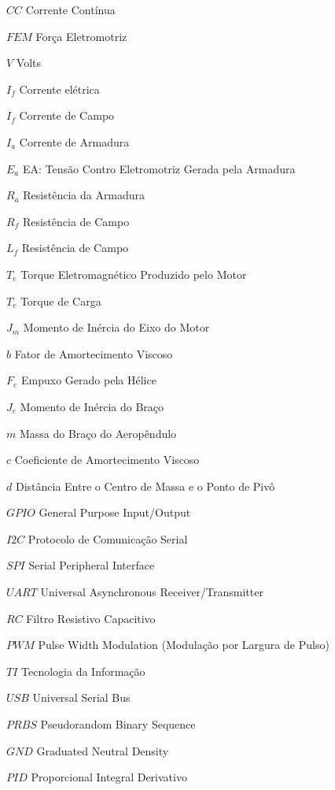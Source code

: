 \begin{siglas}
    \item[$CC$] Corrente Contínua
    \item[$FEM$] Força Eletromotriz
    \item[$V$] Volts
    \item[$I_f$] Corrente elétrica
   \item[$I_f$] Corrente de Campo
   \item[$I_a$] Corrente de Armadura
   \item[$E_a$] EA: Tensão Contro Eletromotriz Gerada pela Armadura
   \item[$R_a$] Resistência da Armadura
   \item[$R_f$] Resistência de Campo
   \item[$L_f$] Resistência de Campo
   \item[$T_e$] Torque Eletromagnético Produzido pelo Motor
   \item[$T_c$]  Torque de Carga
   \item[$J_m$]  Momento de Inércia do Eixo do Motor
   \item[$b$]  Fator de Amortecimento Viscoso
   \item[$F_e$]  Empuxo Gerado pela Hélice
   \item[$J_e$]  Momento de Inércia do Braço
   \item[$m$]   Massa do Braço do Aeropêndulo
   \item[$c$]  Coeficiente de Amortecimento Viscoso
    \item[$d$]   Distância Entre o Centro de Massa e o Ponto de Pivô
    \item[$GPIO$]  General Purpose Input/Output
    \item[$I2C$]  Protocolo de Comunicação Serial 
    \item[$SPI$]  Serial Peripheral Interface
    \item[$UART$]  Universal Asynchronous Receiver/Transmitter
    \item[$RC$]  Filtro Resistivo Capacitivo
    \item[$PWM$]  Pulse Width Modulation (Modulação por Largura de Pulso)
    \item[$TI$]  Tecnologia da Informação
    \item[$USB$]  Universal Serial Bus
    \item[$PRBS$] Pseudorandom Binary Sequence
    \item[$GND$] Graduated Neutral Density
    \item[$PID$] Proporcional Integral Derivativo
\end{siglas}